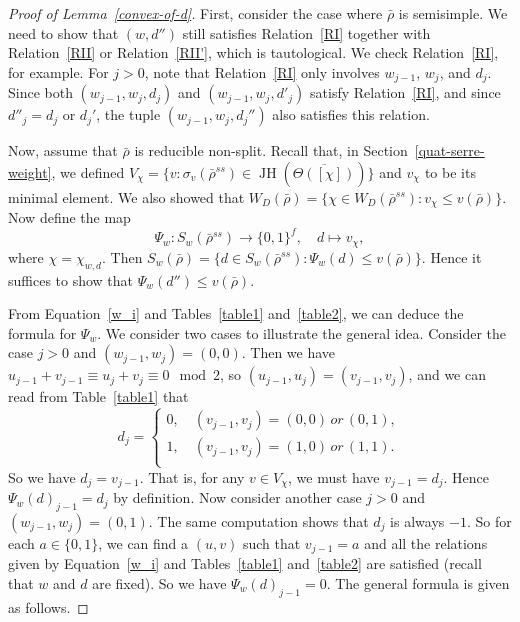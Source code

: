 \documentclass{article}
\numberwithin{equation}{section}
\DeclareMathOperator{\JH}{JH}
\begin{document}
\begin{proof}[Proof of Lemma~\ref{convex-of-d}]
    First, consider the case where $\bar{\rho}$ is semisimple. 
    We need to show that $(w,d'')$ still satisfies Relation~\ref{RI} together with Relation~\ref{RII} or Relation~\ref{RII'}, 
    which is tautological. We check Relation~\ref{RI}, for example. 
    For $j>0$, note that Relation~\ref{RI} only involves $w_{j-1}$, $w_j$, and $d_j$. 
    Since both $(w_{j-1},w_j,d_j)$ and $(w_{j-1},w_j,d'_j)$ satisfy Relation~\ref{RI}, 
    and since $d''_j=d_j$ or $d_j'$, the tuple $(w_{j-1},w_j,d_j'')$ also satisfies this relation. 

    Now, assume that $\bar{\rho}$ is reducible non-split. 
    Recall that, in Section~\ref{quat-serre-weight}, we defined $V_{\chi}=\{v:\sigma_v(\bar{\rho}^{ss})\in\JH(\overline{\Theta([\chi])})\}$ and $v_\chi$ to be its minimal element. 
    We also showed that $W_D(\bar{\rho})=\{\chi\in W_D(\bar{\rho}^{ss}): v_{\chi}\leq v(\bar{\rho})\}$. 
    Now define the map 
    $$\Psi_w:S_w(\bar{\rho}^{ss})\to \{0,1\}^f,\quad d\mapsto v_{\chi},$$
    where $\chi=\chi_{w,d}$. 
    Then $S_w(\bar{\rho})=\{d\in S_w(\bar{\rho}^{ss}):\Psi_w(d)\leq v(\bar{\rho})\}$. 
    Hence it suffices to show that $\Psi_{w}(d'')\leq v(\bar{\rho})$. 

    From Equation~\ref{w_i} and Tables~\ref{table1} and~\ref{table2}, we can deduce the formula for $\Psi_{w}$. 
    We consider two cases to illustrate the general idea. Consider the case $j>0$ and $(w_{j-1},w_j)=(0,0)$. 
    Then we have $u_{j-1}+v_{j-1}\equiv u_j+v_j\equiv 0 \mod 2$, 
    so $(u_{j-1},u_j)=(v_{j-1},v_j)$, and we can read from Table~\ref{table1} that 
    $$d_j=\begin{cases}
        0, \quad (v_{j-1},v_j)=(0,0)\, or \,(0,1),\\
        1, \quad (v_{j-1},v_j)=(1,0)\, or\, (1,1).\\
    \end{cases}$$
    So we have $d_j=v_{j-1}$. That is, for any $v\in V_\chi$,  
    we must have $v_{j-1}=d_j$. 
    Hence $\Psi_{w}(d)_{j-1}=d_j$ by definition. Now consider another case $j>0$ and $(w_{j-1},w_j)=(0,1)$. 
    The same computation shows that $d_j$ is always $-1$. So for each $a\in \{0,1\}$, 
    we can find a $(u,v)$ such that $v_{j-1}=a$ and 
    all the relations given by Equation~\ref{w_i} and Tables~\ref{table1} and~\ref{table2} are satisfied (recall that $w$ and $d$ are fixed). 
    So we have $\Psi_{w}(d)_{j-1}=0$. The general formula is given as follows. 



\end{proof}
\end{document}
